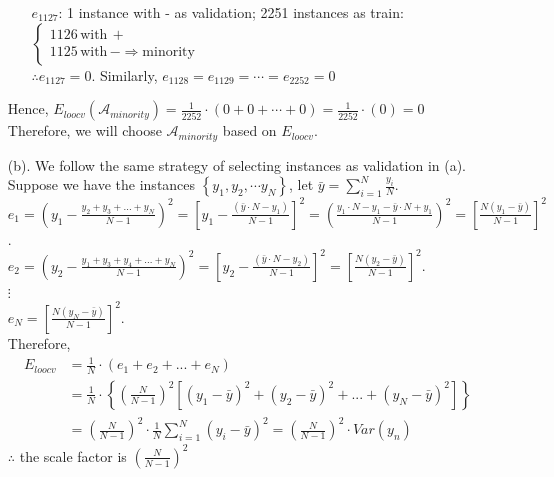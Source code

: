 \documentclass[a4paper,12pt]{article}
\begin{document}
\begin{itemize}
\begin{itemize}
   \item [$e_{1127}$:] 1 instance with - as validation; 2251 instances as train: $\begin{cases}
1126 \, \text{with} \, +  \\
1125 \, \text{with} \, - \Rightarrow \text{minority}
\end{cases}$\\
   $\therefore e_{1127}=0$. Similarly, $e_{1128}=e_{1129}= \cdots =e_{2252}=0$
  \end{itemize}
  Hence, $E_{loocv}(\mathcal{A}_{minority})= \frac{1}{2252} \cdot (0+0+ \cdots +0)=\frac{1}{2252}\cdot(0)=0$\\
  Therefore, we will choose $\mathcal{A}_{minority}$ based on $E_{loocv}$.

 \item [(b).] We follow the same strategy of selecting instances as validation in (a). Suppose we have the instances $\left \{ y_{1}, y_{2}, \cdots y_{N} \right \}$, let $\displaystyle \bar{y}=\sum_{i=1}^{N} \frac{y_{i}}{N}$.\\
 \newline
 $\displaystyle e_{1}= \left (y_{1} - \frac{y_{2}+y_{3}+...+y_{N}}{N-1}  \right )^{2} = \left [   y_{1} - \frac{\left ( \bar{y} \cdot N - y_{1} \right )}{N-1} \right ]^{2} = \left (   \frac{y_{1} \cdot N -y_{1}- \bar{y} \cdot N + y_{1}}{N-1} \right )^{2} = \left [    \frac{N\left ( y_{1}- \bar{y} \right )}{N-1}   \right ]^{2}$.\\
 $\displaystyle e_{2}= \left (y_{2} - \frac{y_{1}+y_{3}+y_{4}+...+y_{N}}{N-1}  \right )^{2} = \left [   y_{2} - \frac{\left ( \bar{y} \cdot N - y_{2} \right )}{N-1} \right ]^{2} = \left [    \frac{N\left ( y_{2}- \bar{y} \right )}{N-1}   \right ]^{2}$.\\
 $\vdots$\\
 $\displaystyle e_{N}= \left [    \frac{N\left ( y_{N}- \bar{y} \right )}{N-1}   \right ]^{2}$.\\
 \newline
 Therefore,
 \begin{align*}
  E_{loocv} &= \frac{1}{N} \cdot (e_{1}+e_{2}+...+e_{N}) \\
  &= \frac{1}{N} \cdot \left \{  (\frac{N}{N-1})^{2} \left [  (y_{1}- \bar{y})^2 +  (y_{2}- \bar{y})^2 + ... +  (y_{N}- \bar{y})^2  \right ]   \right \} \\
  &= (\frac{N}{N-1})^2 \cdot \frac{1}{N} \sum_{i=1}^{N} (y_{i}- \bar{y})^2 = (\frac{N}{N-1})^2 \cdot Var(y_{n})
 \end{align*}
 $\therefore$ the scale factor is $\displaystyle (\frac{N}{N-1})^2$
\end{itemize} 




\medskip
\end{document}
